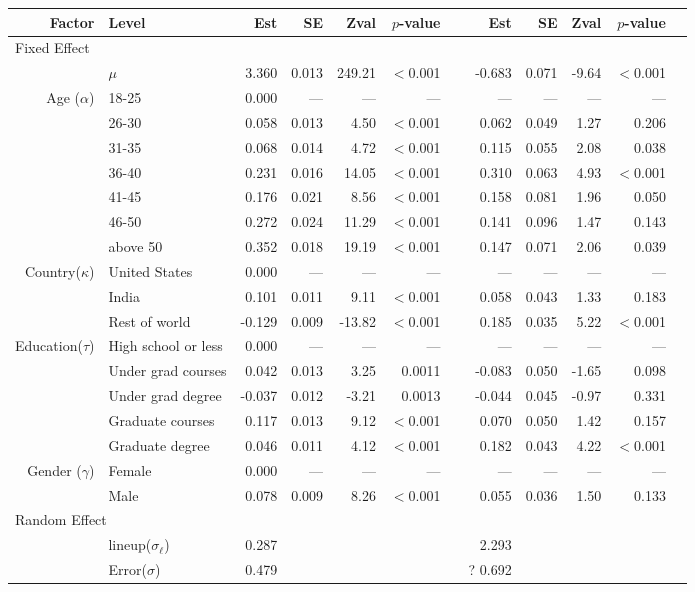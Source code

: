 \documentclass[10pt]{article}\usepackage[]{graphicx}\usepackage[]{color}
\newcommand{\mm}[1]{{\color{mahbub} #1}}
\begin{document}
\begin{table}[htbp]
{\begin{tabular}{rlrrrrrrrrrr}
\cline{3-6} \cline{8-11} 
Factor & Level& Est & SE & Zval & $p$-value && Est & SE & Zval & $p$-value  \\ 
  \hline
\multicolumn{2}{l}{Fixed Effect} &  &  &  &  &  & & && \\ 
&$\mu$ & 3.360 & 0.013 & 249.21 & $<$0.001 &   & -0.683 & 0.071 & -9.64 & $<$0.001 \\ 
\hline
Age ($\alpha$)& 18-25&0.000   &---  &---  &---  &  &--- &--- &---& ---\\   
 &26-30 & 0.058 & 0.013 & 4.50 & $<$0.001 &   & 0.062 & 0.049 & 1.27 & 0.206 \\ 
  &31-35 & 0.068 & 0.014 & 4.72 & $<$0.001 &   & 0.115 & 0.055 & 2.08 & 0.038 \\ 
  &36-40 & 0.231 & 0.016 & 14.05 & $<$0.001 &   & 0.310 & 0.063 & 4.93 & $<$0.001 \\ 
  &41-45 & 0.176 & 0.021 & 8.56 & $<$0.001 &   & 0.158 & 0.081 & 1.96 & 0.050 \\ 
  &46-50 & 0.272 & 0.024 & 11.29 & $<$0.001 &   & 0.141 & 0.096 & 1.47 & 0.143 \\ 
  &above 50 & 0.352 & 0.018 & 19.19 & $<$0.001 &   & 0.147 & 0.071 & 2.06 & 0.039 \\ 
  \hline
Country($\kappa$)& United States&0.000   &---  &---  &---  &  &--- &--- &---& ---\\  
  &India & 0.101 & 0.011 & 9.11 & $<$0.001 &   & 0.058 & 0.043 & 1.33 & 0.183 \\ 
  &Rest of world & -0.129 & 0.009 & -13.82 & $<$0.001 &   & 0.185 & 0.035 & 5.22 & $<$0.001 \\ 
  \hline
Education($\tau$) &High school or less&0.000   &---  &---  &---  &  &--- &--- &---& ---\\     
 &Under grad courses & 0.042 & 0.013 & 3.25 & 0.0011 &   & -0.083 & 0.050 & -1.65 & 0.098 \\ 
  &Under grad degree & -0.037 & 0.012 & -3.21 & 0.0013 &   & -0.044 & 0.045 & -0.97 & 0.331 \\ 
  &Graduate courses & 0.117 & 0.013 & 9.12 & $<$0.001 &   & 0.070 & 0.050 & 1.42 & 0.157 \\ 
  &Graduate degree & 0.046 & 0.011 & 4.12 & $<$0.001 &   & 0.182 & 0.043 & 4.22 & $<$0.001 \\ 
  \hline
Gender ($\gamma$)& Female&0.000   &---  &---  &---  &  &--- &--- &---& ---\\      
  &Male & 0.078 & 0.009 & 8.26 & $<$0.001 &   & 0.055 & 0.036 & 1.50 & 0.133 \\ 
  \hline
\multicolumn{2}{l}{Random Effect} &  &  &  &  &  & & && \\ 
& lineup($\sigma_{\ell}$) & 0.287 &  &  &  &   & 2.293 &  &  &  \\ 
 & Error($\sigma$) & 0.479 & &  &  &  & \mm{? 0.692}&& &\\ 
   \hline
\end{tabular}
}
\label{tbl:model_result_demographics}
\end{table}
\end{document}
